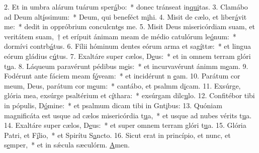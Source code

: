 2. Et in umbra alárum tuárum sper\uline{á}bo:~* donec tránseat in\uline{qui}tas.
3. Clamábo ad Deum alt\uline{í}ssimum:~* Deum, qui beneféct m\uline{i}hi.
4. Misit de cælo, et liber\uline{á}vit me:~* dedit in oppróbrium conculcnt\uline{e}s me.
5. Misit Deus misericórdiam suam, et veritátem suam,~† et erípuit ánimam meam de médio catulórum le\uline{ó}num:~* dormívi contrb\uline{á}tus.
6. Fílii hóminum dentes eórum arma et sag\uline{í}ttæ:~* et lingua eórum gládius c\uline{ú}tus.
7. Exaltáre super cælos, D\uline{e}us:~* et in omnem terram glóri t\uline{u}a.
8. Láqueum paravérunt pédibus m\uline{e}is:~* et incurvavérunt ánimm m\uline{e}am.
9. Fodérunt ante fáciem meam f\uline{ó}veam:~* et incidérunt n \uline{e}am.
10. Parátum cor meum, Deus, parátum cor m\uline{e}um:~* cantábo, et psalmm d\uline{i}cam.
11. Exsúrge, glória mea, exsúrge psaltérium et c\uline{í}thara:~* exsúrgam dilc\uline{u}lo.
12. Confitébor tibi in pópulis, D\uline{ó}mine:~* et psalmum dicam tibi in Gnt\uline{i}bus:
13. Quóniam magnificáta est usque ad cælos misericórdia t\uline{u}a,~* et usque ad nubes vérits t\uline{u}a.
14. Exaltáre super cælos, D\uline{e}us:~* et super omnem terram glóri t\uline{u}a.
15. Glória Patri, et F\uline{í}lio,~* et Spirítu S\uline{a}ncto.
16. Sicut erat in princípio, et nunc, et s\uline{e}mper,~* et in sǽcula sæculórm. \uline{A}men.
